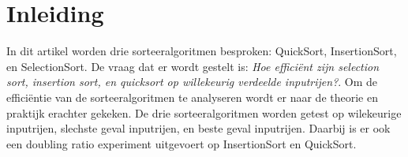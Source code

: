\section{Inleiding}

In dit artikel worden drie sorteeralgoritmen besproken: QuickSort, InsertionSort, en SelectionSort. De vraag dat er wordt gestelt is: \textit{Hoe efficiënt zijn selection sort, insertion sort, en quicksort op willekeurig verdeelde inputrijen?}. Om de efficiëntie van de sorteeralgoritmen te analyseren wordt er naar de theorie en praktijk erachter gekeken. De drie sorteeralgoritmen worden getest op wilekeurige inputrijen, slechste geval inputrijen, en beste geval inputrijen. Daarbij is er ook een doubling ratio experiment uitgevoert op InsertionSort en QuickSort.
